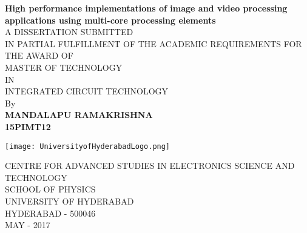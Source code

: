 %
\begin{titlepage}
	\begin{center}
		\vspace{0.5cm}	
	{\Large 	\textbf{High performance implementations of image and video processing applications using multi-core processing elements\\}}
		\vspace*{1cm}
		{\small A DISSERTATION SUBMITTED \\
		IN PARTIAL FULFILLMENT OF THE ACADEMIC REQUIREMENTS FOR \\
		THE AWARD OF \\}
		\vspace{0.5cm}
		MASTER OF TECHNOLOGY \\
		IN \\
		INTEGRATED CIRCUIT TECHNOLOGY \\
		
		\vspace{1.5cm}
			By \\
		\textbf{MANDALAPU RAMAKRISHNA}\\
		\textbf{15PIMT12}
		
		\vspace{1.5cm}
		
		\texttt{[image: UniversityofHyderabadLogo.png]}
		
	{\scriptsize 	CENTRE FOR ADVANCED STUDIES IN ELECTRONICS SCIENCE AND TECHNOLOGY \\
		SCHOOL OF PHYSICS \\
		UNIVERSITY OF HYDERABAD \\
		HYDERABAD - 500046 \\
		MAY - 2017 \\}
		
	\end{center}
\end{titlepage}
%